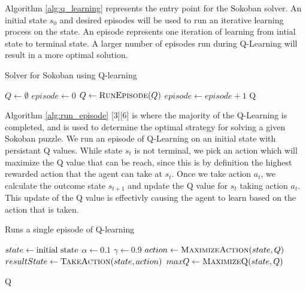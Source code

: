 \documentclass[times, 10pt,twocolumn]{article}
\begin{document}

Algorithm \ref{alg:q_learning} represents the entry point for the Sokoban solver.  An initial state $s_0$ and desired episodes will be used to run an iterative learning process on the state.  An episode represents one iteration of learning from intial state to terminal state.  A larger number of episodes run during Q-Learning will result in a more optimal solution.

\begin{algorithm}
  \caption{Solver for Sokoban using Q-learning}
  \begin{algorithmic}[1]
      \State $Q\gets \emptyset$
      \State $episode\gets 0$
        \State $Q\gets \Call{RunEpisode}{Q}$
        \State $episode\gets episode + 1$
      \EndWhile
      \State \Return Q
    \EndFunction
  \end{algorithmic}
\label{alg:q_learning}
\end{algorithm}

Algorithm \ref{alg:run_episode} [3][6] is where the majority of the Q-Learning is completed, and is used to determine the optimal strategy for solving a given Sokoban puzzle.  We run an episode of Q-Learning on an initial state with persistant Q values.  While state $s_t$ is not terminal, we pick an action which will maximize the Q value that can be reach, since this is by definition the highest rewarded action that the agent can take at $s_t$.  Once we take action $a_t$, we calculate the outcome state $s_{t+1}$ and update the Q value for $s_t$ taking action $a_t$.  This update of the Q value is effectivly causing the agent to learn based on the action that is taken.

\begin{algorithm}
  \caption{Runs a single episode of Q-learning}
  \begin{algorithmic}[1]
      \State $state\gets \textnormal{initial state}$
      \State $\alpha \gets 0.1$ 
      \State $\gamma \gets 0.9$ 
        \State $action\gets \Call{MaximizeAction}{state, Q}$
        \State $resultState\gets \Call{TakeAction}{state, action}$
        \State $maxQ\gets \Call{MaximizeQ}{state, Q}$
        \State {}
      \EndWhile
      \State \Return Q
    \EndFunction
  \end{algorithmic}
  \label{alg:run_episode}
\end{algorithm}
\end{document}
